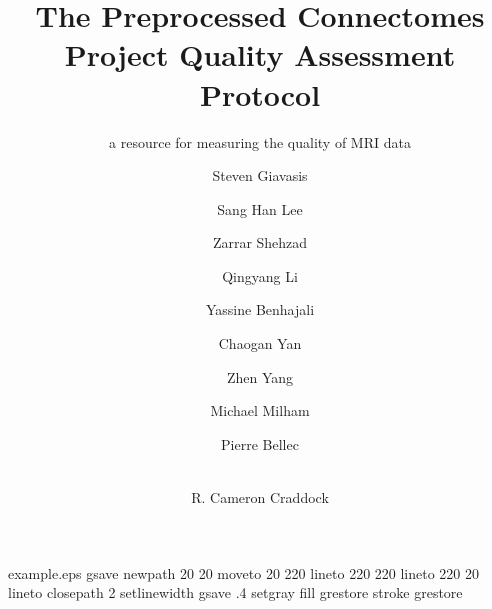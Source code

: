 %
%
%
%
%
\begin{filecontents*}{example.eps}
gsave
newpath
  20 20 moveto
  20 220 lineto
  220 220 lineto
  220 20 lineto
closepath
2 setlinewidth
gsave
  .4 setgray fill
grestore
stroke
grestore
\end{filecontents*}
%
\RequirePackage{fix-cm}
%
\documentclass[smallextended]{svjour3}       %
%
\smartqed  %
%
\usepackage{graphicx}
%
%
%
%
%


\title{The Preprocessed Connectomes Project Quality Assessment Protocol%
}
\subtitle{a resource for measuring the quality of MRI data}


\author{Steven Giavasis      \and
        Sang Han Lee         \and
        Zarrar Shehzad       \and
        Qingyang Li          \and
        Yassine Benhajali    \and
        Chaogan Yan          \and
        Zhen Yang            \and
        Michael Milham       \and
        Pierre Bellec        \and
        \\ R. Cameron Craddock
}

